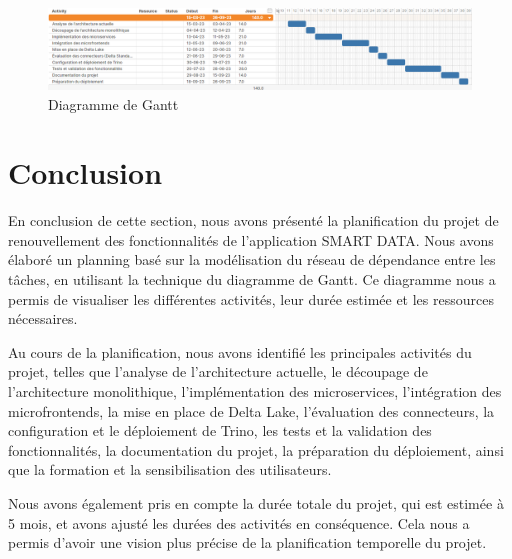 \begin{figure}[H]
\centering
\includegraphics[width=\linewidth]{images/gantt.png}
\caption{Diagramme de Gantt}\label{fig:gantt}
\end{figure}

\section*{Conclusion}

En conclusion de cette section, nous avons présenté la planification du projet de renouvellement des fonctionnalités de l'application SMART DATA. Nous avons élaboré un planning basé sur la modélisation du réseau de dépendance entre les tâches, en utilisant la technique du diagramme de Gantt. Ce diagramme nous a permis de visualiser les différentes activités, leur durée estimée et les ressources nécessaires.

Au cours de la planification, nous avons identifié les principales activités du projet, telles que l'analyse de l'architecture actuelle, le découpage de l'architecture monolithique, l'implémentation des microservices, l'intégration des microfrontends, la mise en place de Delta Lake, l'évaluation des connecteurs, la configuration et le déploiement de Trino, les tests et la validation des fonctionnalités, la documentation du projet, la préparation du déploiement, ainsi que la formation et la sensibilisation des utilisateurs.

Nous avons également pris en compte la durée totale du projet, qui est estimée à 5 mois, et avons ajusté les durées des activités en conséquence. Cela nous a permis d'avoir une vision plus précise de la planification temporelle du projet.